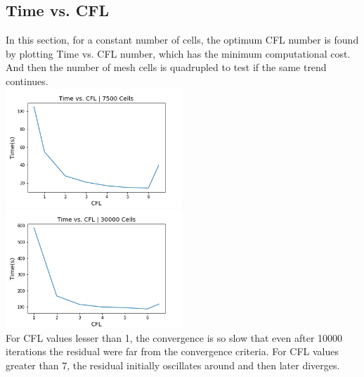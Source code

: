 \subsection{Time vs. CFL}
In this section, for a constant number of cells, the optimum CFL number is found by plotting Time vs. CFL number, which has the minimum computational cost. And then the number of mesh cells is quadrupled to test if the same trend continues.\\
\includegraphics[width=0.5\textwidth]{text/time_vs_CFL_7500_Cells.png}
\includegraphics[width=0.5\textwidth]{text/time_vs_CFL_30000_Cells.png}\\
For CFL values lesser than 1, the convergence is so slow that even after 10000 iterations the residual were far from the convergence criteria. For CFL values greater than 7, the residual initially oscillates around and then later diverges.\\
\newpage